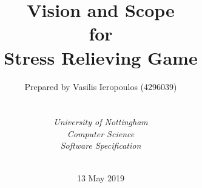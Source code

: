 

\def\Institute{\textit{University of Nottingham}}
\def\Course{\textit{Computer Science}}
\def\Module{\textit{ Software Specification}}



\def\BoldTitle{Vision and Scope}

\def\Subtitle{for \\ Stress Relieving Game \\}
\def\Authors{Prepared by Vasilis Ieropoulos (4296039) } 
\def\Shortname{V.Ieropoulos}

\title{\textbf{\BoldTitle}\\\Subtitle}
\author{\Authors \\ \\ \\ \Institute\\ \Course\\ \Module\\ \Docent\\ \Assistant}
\date{13 May 2019}

